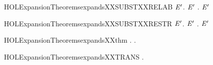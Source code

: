 \newcommand{\HOLExpansionTheoremsexpandsXXSUBSTXXPREFIX}{\UseVerbatim{HOLExpansionTheoremsexpandsXXSUBSTXXPREFIX}}
\begin{SaveVerbatim}{HOLExpansionTheoremsexpandsXXSUBSTXXRELAB}
\HOLTokenTurnstile{} \HOLSymConst{\HOLTokenForall{}} \ensuremath{\HOLBoundVar{E}\sp{\prime}}.   \ensuremath{\HOLBoundVar{E}\sp{\prime}} \HOLSymConst{\HOLTokenImp{}} \HOLSymConst{\HOLTokenForall{}}.      \ensuremath{\HOLBoundVar{E}\sp{\prime}} 
\end{SaveVerbatim}
\newcommand{\HOLExpansionTheoremsexpandsXXSUBSTXXRELAB}{\UseVerbatim{HOLExpansionTheoremsexpandsXXSUBSTXXRELAB}}
\begin{SaveVerbatim}{HOLExpansionTheoremsexpandsXXSUBSTXXRESTR}
\HOLTokenTurnstile{} \HOLSymConst{\HOLTokenForall{}} \ensuremath{\HOLBoundVar{E}\sp{\prime}}.   \ensuremath{\HOLBoundVar{E}\sp{\prime}} \HOLSymConst{\HOLTokenImp{}} \HOLSymConst{\HOLTokenForall{}}.       \ensuremath{\HOLBoundVar{E}\sp{\prime}}
\end{SaveVerbatim}
\newcommand{\HOLExpansionTheoremsexpandsXXSUBSTXXRESTR}{\UseVerbatim{HOLExpansionTheoremsexpandsXXSUBSTXXRESTR}}
\begin{SaveVerbatim}{HOLExpansionTheoremsexpandsXXthm}
\HOLTokenTurnstile{} \HOLSymConst{\HOLTokenForall{}} .    \HOLSymConst{\HOLTokenEquiv{}} \HOLSymConst{\HOLTokenExists{}}.    \HOLSymConst{\HOLTokenConj{}}  
\end{SaveVerbatim}
\newcommand{\HOLExpansionTheoremsexpandsXXthm}{\UseVerbatim{HOLExpansionTheoremsexpandsXXthm}}
\begin{SaveVerbatim}{HOLExpansionTheoremsexpandsXXTRANS}
\HOLTokenTurnstile{} \HOLSymConst{\HOLTokenForall{}}  .    \HOLSymConst{\HOLTokenConj{}}    \HOLSymConst{\HOLTokenImp{}}   
\end{SaveVerbatim}
\newcommand{\HOLExpansionTheoremsexpandsXXTRANS}{\UseVerbatim{HOLExpansionTheoremsexpandsXXTRANS}}
